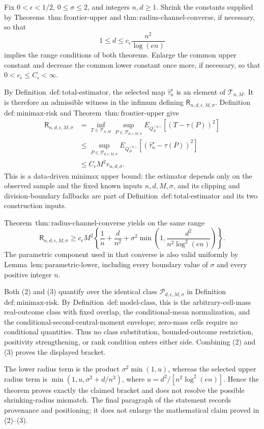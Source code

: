 Fix \(0<\epsilon<1/2\), \(0\le\sigma\le2\), and integers \(n,d\ge1\).  Shrink the constants supplied by Theorems~\(\mathrm{thm:frontier\text{-}upper}\) and \(\mathrm{thm:radius\text{-}channel\text{-}converse}\), if necessary, so that
\[
 1\le d\le c_{\epsilon}\frac{n^2}{\log(en)}
\tag{1}
\]
implies the range conditions of both theorems.  Enlarge the common upper constant and decrease the common lower constant once more, if necessary, so that \(0<c_{\epsilon}\le C_{\epsilon}<\infty\).

By Definition~\(\mathrm{def:total\text{-}estimator}\), the selected map \(\widehat\tau_n^{\star}\) is an element of \(\mathcal T_{n,M}\).  It is therefore an admissible witness in the infimum defining \(\mathsf R_{n,d,\epsilon,M,\sigma}\).  Definition~\(\mathrm{def:minimax\text{-}risk}\) and Theorem~\(\mathrm{thm:frontier\text{-}upper}\) give
\[
\begin{aligned}
 \mathsf R_{n,d,\epsilon,M,\sigma}
 &=\inf_{T\in\mathcal T_{n,M}}
   \sup_{P\in\mathcal P_{d,\epsilon,M,\sigma}}
   E_{Q_P^{(n)}}[(T-\tau(P))^2]\\
 &\le
   \sup_{P\in\mathcal P_{d,\epsilon,M,\sigma}}
   E_{Q_P^{(n)}}[(\widehat\tau_n^{\star}-\tau(P))^2]\\
 &\le C_{\epsilon}M^2r_{n,d,\sigma}.
\end{aligned}
\tag{2}
\]
This is a data-driven minimax upper bound: the estimator depends only on the observed sample and the fixed known inputs \(n,d,M,\sigma\), and its clipping and division-boundary fallbacks are part of Definition~\(\mathrm{def:total\text{-}estimator}\) and its two construction inputs.

Theorem~\(\mathrm{thm:radius\text{-}channel\text{-}converse}\) yields on the same range
\[
 \mathsf R_{n,d,\epsilon,M,\sigma}
 \ge c_{\epsilon}M^2\left\{
 \frac1n+\frac d{n^2}
 +\sigma^2\min\left(1,\frac{d^2}{n^2\log^2(en)}\right)
 \right\}.
\tag{3}
\]
The parametric component used in that converse is also valid uniformly by Lemma~\(\mathrm{lem:parametric\text{-}lower}\), including every boundary value of \(\sigma\) and every positive integer \(n\).

Both (2) and (3) quantify over the identical class \(\mathcal P_{d,\epsilon,M,\sigma}\) in Definition~\(\mathrm{def:minimax\text{-}risk}\).  By Definition~\(\mathrm{def:model\text{-}class}\), this is the arbitrary-cell-mass real-outcome class with fixed overlap, the conditional-mean normalization, and the conditional-second-central-moment envelope; zero-mass cells require no conditional quantities.  Thus no class substitution, bounded-outcome restriction, positivity strengthening, or rank condition enters either side.  Combining (2) and (3) proves the displayed bracket.

The lower radius term is the product \(\sigma^2\min(1,u)\), whereas the selected upper radius term is \(\min(1,u,\sigma^2+d/n^2)\), where \(u=d^2/[n^2\log^2(en)]\).  Hence the theorem proves exactly the claimed bracket and does not resolve the possible shrinking-radius mismatch.  The final paragraph of the statement records provenance and positioning; it does not enlarge the mathematical claim proved in (2)--(3).